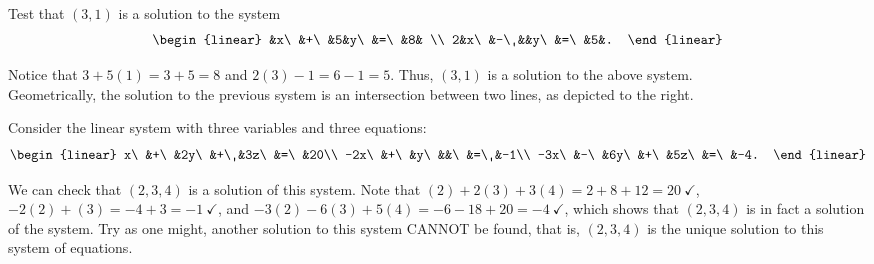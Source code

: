 \begin{multicols}{2}
\begin{Exam}\label{exam:1.1firstgeom} Test that $(3,1)$ is a solution to the system \[\begin{linear} &x\ &+\ &5&y\ &=\ &8& \\ 2&x\ &-\ &&y\ &=\ &5&.  \end{linear}\]   

Notice that $3+ 5(1) = 3+5 = 8$ and $2(3) - 1 = 6 -1 = 5$. Thus, $(3,1)$ is a solution to the above system.\\

Geometrically, the solution to the previous system is an intersection between two lines, as depicted to the right. \vspace{-0.2 in}
\begin{center}
\end{center}
\end{Exam}
\end{multicols}\vs

\begin{Exam} \label{exam:1.1firstthree} Consider the linear system with three variables and three equations: \[\begin{linear} x\ &+\ &2y\ &+\ &3z\ &=\ &20\\ -2x\ &+\ &y\ &&\ &=\ &-1\\ -3x\ &-\ &6y\ &+\ &5z\ &=\ &-4. \end{linear}\] %

We can check that $(2,3,4)$ is a solution of this system. Note that $(2) + 2(3) + 3(4) = 2+8+12=20\ \checkmark$, $-2(2) + (3)  = -4+3=-1\ \checkmark$, and $-3(2) - 6(3) + 5(4) = -6-18+20 = -4\ \checkmark$, which shows that $(2,3,4)$ is in fact a solution of the system. Try as one might, another solution to this system CANNOT be found, that is, $(2,3,4)$ is the unique solution to this system of equations.
\end{Exam}

